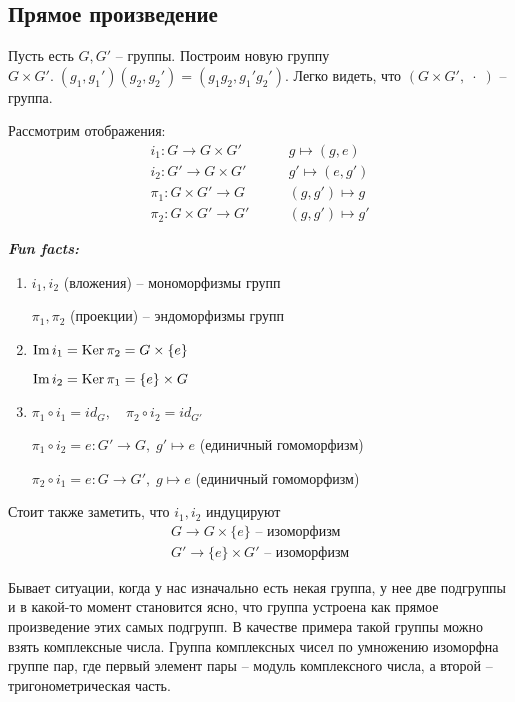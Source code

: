 \subsection{Прямое произведение}
Пусть есть $G, G'$ -- группы. Построим новую группу 
$G \times G'. \; (g_1, g_1')(g_2, g_2') = (g_1g_2, g_1'g_2')$. Легко видеть, 
что $(G \times G', \; \cdot \; )$ -- группа. 

\begin{theorem} 
    Рассмотрим отображения: 
    \begin{align*}
        i_1: G \longrightarrow G \times G' &\qquad g \longmapsto (g, e) \\
        i_2: G' \longrightarrow G \times G' &\qquad g' \longmapsto (e, g') \\
        \pi_1: G \times G' \longrightarrow G &\qquad (g, g') \longmapsto g \\
        \pi_2: G \times G' \longrightarrow G' &\qquad (g, g') \longmapsto g'
    \end{align*}
\end{theorem}
\textbf{\textit{Fun facts: }}
\begin{enumerate}
    \item $i_1, i_2$ (вложения) -- мономорфизмы групп
    
    $\pi_1, \pi_2$ (проекции) -- эндоморфизмы групп
    \item $\operatorname{Im}{i_1} = \operatorname{Ker}{\pi_2} = G \times \{e\}$
    
    $\operatorname{Im}{i_2} = \operatorname{Ker}{\pi_1} = \{e\} \times G$
    \item $\pi_1 \circ i_1 = id_G, \quad \pi_2 \circ i_2 = id_{G'}$
    
    $\pi_1 \circ i_2 = e: G' \longrightarrow G, \; g' \longmapsto e$ (единичный гомоморфизм)

    $\pi_2 \circ i_1 = e: G \longrightarrow G', \; g \longmapsto e$ (единичный гомоморфизм)
\end{enumerate}

Стоит также заметить, что $i_1, i_2$ индуцируют 
\begin{gather*}
    G \longrightarrow G \times \{e\} \text{ -- изоморфизм} \\
    G' \longrightarrow \{e\} \times G' \text{ -- изоморфизм}
\end{gather*}

Бывает ситуации, когда у нас изначально есть некая группа, у нее две подгруппы и в какой-то момент становится 
ясно, что группа устроена как прямое произведение этих самых подгрупп. В качестве примера такой группы можно взять 
комплексные числа. Группа комплексных чисел по умножению изоморфна группе пар, где первый элемент пары -- 
модуль комплексного числа, а второй -- тригонометрическая часть. 

